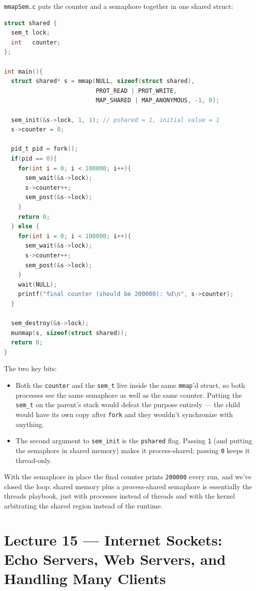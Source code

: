 \documentclass[11pt]{article}
\begin{document}
\texttt{mmapSem.c} puts the counter and a semaphore together in one
shared struct:

\begin{lstlisting}[language=C]
struct shared {
  sem_t lock;
  int   counter;
};

int main(){
  struct shared* s = mmap(NULL, sizeof(struct shared),
                          PROT_READ | PROT_WRITE,
                          MAP_SHARED | MAP_ANONYMOUS, -1, 0);

  sem_init(&s->lock, 1, 1); // pshared = 1, initial value = 1
  s->counter = 0;

  pid_t pid = fork();
  if(pid == 0){
    for(int i = 0; i < 100000; i++){
      sem_wait(&s->lock);
      s->counter++;
      sem_post(&s->lock);
    }
    return 0;
  } else {
    for(int i = 0; i < 100000; i++){
      sem_wait(&s->lock);
      s->counter++;
      sem_post(&s->lock);
    }
    wait(NULL);
    printf("final counter (should be 200000): %d\n", s->counter);
  }

  sem_destroy(&s->lock);
  munmap(s, sizeof(struct shared));
  return 0;
}
\end{lstlisting}

The two key bits:
\begin{itemize}
  \item Both the \texttt{counter} and the \texttt{sem\_t} live inside
    the same \texttt{mmap}'d struct, so both processes see the same
    semaphore as well as the same counter. Putting the
    \texttt{sem\_t} on the parent's stack would defeat the purpose
    entirely --- the child would have its own copy after
    \texttt{fork} and they wouldn't synchronize with anything.
  \item The second argument to \texttt{sem\_init} is the
    \texttt{pshared} flag. Passing \texttt{1} (and putting the
    semaphore in shared memory) makes it process-shared; passing
    \texttt{0} keeps it thread-only.
\end{itemize}

With the semaphore in place the final counter prints
\texttt{200000} every run, and we've closed the loop: shared memory
plus a process-shared semaphore is essentially the threads playbook,
just with processes instead of threads and with the kernel arbitrating
the shared region instead of the runtime.

\section{Lecture 15 --- Internet Sockets: Echo Servers, Web Servers, and Handling Many Clients}
\end{document}
